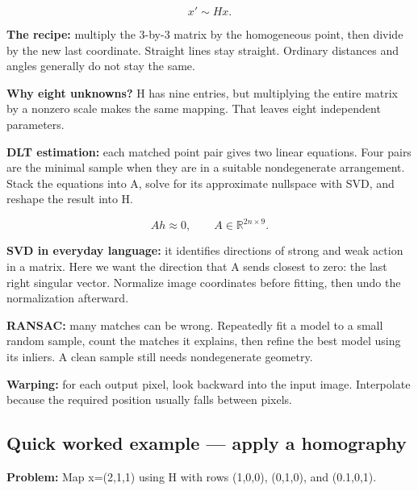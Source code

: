 \documentclass[11pt,letterpaper]{article}
\begin{document}
\begin{tcolorbox}\color{MathBlue}\[x'\sim Hx.\]\end{tcolorbox}


\textbf{The recipe:} multiply the 3-by-3 matrix by the homogeneous point, then divide by the new last coordinate. Straight lines stay straight. Ordinary distances and angles generally do not stay the same.



\textbf{Why eight unknowns?} H has nine entries, but multiplying the entire matrix by a nonzero scale makes the same mapping. That leaves eight independent parameters.



\textbf{DLT estimation:} each matched point pair gives two linear equations. Four pairs are the minimal sample when they are in a suitable nondegenerate arrangement. Stack the equations into A, solve for its approximate nullspace with SVD, and reshape the result into H.



\begin{tcolorbox}\color{MathBlue}\[Ah\approx0,\qquad A\in\mathbb R^{2n\times9}.\]\end{tcolorbox}


\textbf{SVD in everyday language:} it identifies directions of strong and weak action in a matrix. Here we want the direction that A sends closest to zero: the last right singular vector. Normalize image coordinates before fitting, then undo the normalization afterward.



\textbf{RANSAC:} many matches can be wrong. Repeatedly fit a model to a small random sample, count the matches it explains, then refine the best model using its inliers. A clean sample still needs nondegenerate geometry.



\textbf{Warping:} for each output pixel, look backward into the input image. Interpolate because the required position usually falls between pixels.



\subsection*{Quick worked example — apply a homography}


\textbf{Problem:} Map x=(2,1,1) using H with rows (1,0,0), (0,1,0), and (0.1,0,1).
\end{document}
